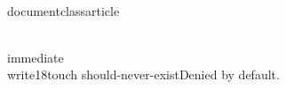 \\documentclass{article}
\begin{document}
\\immediate\\write18{touch should-never-exist}Denied by default.\
\end{document}
